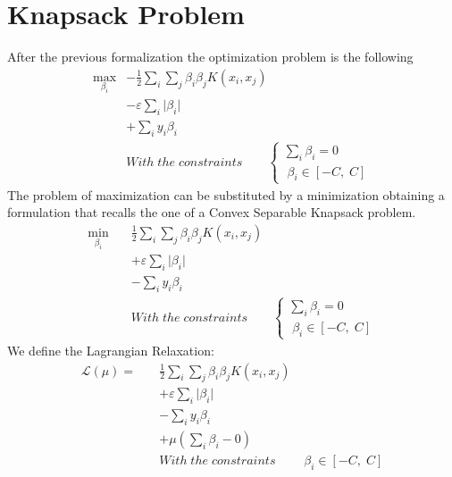 \documentclass[12pt]{article}
\newcommand{\abs}[1]{\lvert#1\rvert}
\newcommand{\Lagr}{\mathcal{L}}
\begin{document}
    \section{Knapsack Problem}
    After the previous formalization the optimization problem is the following
	\begin{equation}\label{eq:7}
	    \begin{aligned}
	    \max_{\beta_i} &- \frac{1}{2}\sum_i \sum_j \beta_i \beta_j K(x_i,x_j) \\
		&- \varepsilon\sum_i\abs{\beta_i}\\
		&+ \sum_i y_i\beta_i\\
		&With\;the\;constraints\qquad
        \begin{cases}
            \sum_i \beta_i = 0 \\
            \;\beta_i\in[-C,\;C] 
        \end{cases}
        \end{aligned}
	\end{equation}
	The problem of maximization can be substituted by a minimization obtaining a formulation that recalls the one of a Convex Separable Knapsack problem.
	\begin{equation}\label{eq:8}
	    \begin{aligned}
	    \min_{\beta_i} \quad & \frac{1}{2}\sum_i \sum_j \beta_i \beta_j K(x_i,x_j) \\
		&+ \varepsilon\sum_i\abs{\beta_i}\\
		&- \sum_i y_i\beta_i\\
		&With\;the\;constraints\qquad
        \begin{cases}
            \sum_i \beta_i = 0 \\
            \;\beta_i\in[-C,\;C] 
        \end{cases}
        \end{aligned}
	\end{equation}
	We define the Lagrangian Relaxation:
	\begin{equation}\label{eq:9}
	    \begin{aligned}
	    \Lagr(\mu) =  \quad & \frac{1}{2}\sum_i \sum_j \beta_i \beta_j K(x_i,x_j) \\
		&+ \varepsilon\sum_i\abs{\beta_i}\\
		&- \sum_i y_i\beta_i\\
		&+ \mu(\sum_i \beta_i - 0)\\
		&With\;the\;constraints\qquad
        \;\beta_i\in[-C,\;C] 
		\end{aligned}
	\end{equation}
\end{document}
